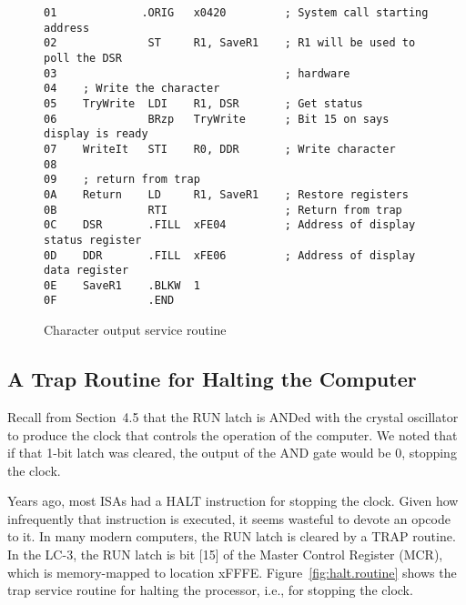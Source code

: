 \documentclass{patt}
\begin{document}
\begin{figure}[h!]
\begin{Verbatim}[fontsize=\fontsize{9}{10}\selectfont]
01             .ORIG   x0420         ; System call starting address
02              ST     R1, SaveR1    ; R1 will be used to poll the DSR
03                                   ; hardware
04    ; Write the character
05    TryWrite  LDI    R1, DSR       ; Get status
06              BRzp   TryWrite      ; Bit 15 on says display is ready
07    WriteIt   STI    R0, DDR       ; Write character
08
09    ; return from trap
0A    Return    LD     R1, SaveR1    ; Restore registers
0B              RTI                  ; Return from trap 
0C    DSR       .FILL  xFE04         ; Address of display status register
0D    DDR       .FILL  xFE06         ; Address of display data register
0E    SaveR1    .BLKW  1
0F              .END
\end{Verbatim}
\caption{Character output service routine}
\label{fig:char.output}
\end{figure}

\FloatBarrier
\subsection{A Trap Routine for Halting the Computer}

Recall from Section~4.5 that the RUN latch is ANDed with the crystal
oscillator to produce the clock that controls the operation of the
computer.  We noted that if that 1-bit latch was cleared, the output
of the AND gate would be 0, stopping the clock.

Years ago, most ISAs had a HALT instruction for stopping the clock.
Given how infrequently that instruction is executed, it seems wasteful
to devote an opcode to it. In many modern computers, the RUN latch is
cleared by a TRAP routine.  In the LC-3, the RUN latch is bit [15] of
the Master Control Register (MCR), which is memory-mapped to location
xFFFE.  Figure~\ref{fig:halt.routine} shows the trap service routine
for halting the processor, i.e., for stopping the clock.
\end{document}
